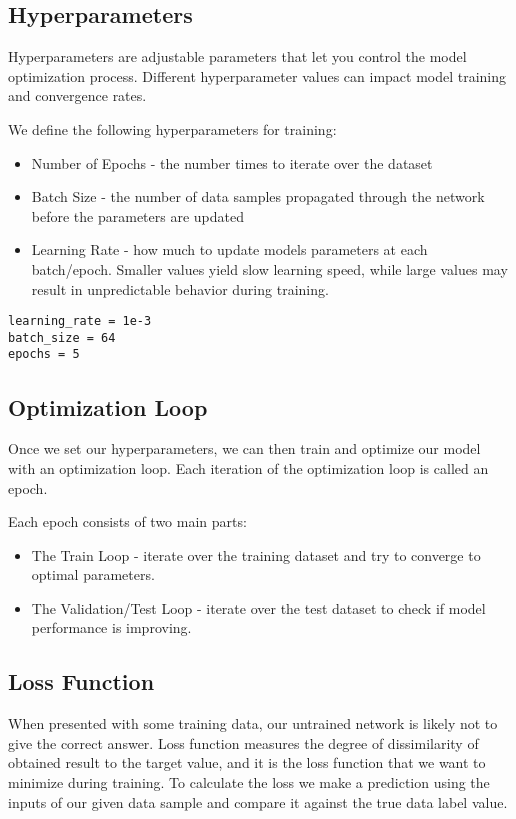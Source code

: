 \documentclass{article}
\begin{document}
\subsection{Hyperparameters}

Hyperparameters are adjustable parameters that let you control the model 
optimization process. Different hyperparameter values can impact model 
training and convergence rates.

We define the following hyperparameters for training:

\begin{itemize}
    \item Number of Epochs - the number times to iterate over the dataset
    \item Batch Size - the number of data samples propagated through the network before the parameters are updated
    \item Learning Rate - how much to update models parameters at each batch/epoch. Smaller values yield slow learning speed, while large values may result in unpredictable behavior during training.
\end{itemize}

\begin{lstlisting}
learning_rate = 1e-3
batch_size = 64
epochs = 5
\end{lstlisting}

\subsection{Optimization Loop}

Once we set our hyperparameters, we can then train and optimize our model 
with an optimization loop. Each iteration of the optimization loop is 
called an epoch.

Each epoch consists of two main parts:

\begin{itemize}
    \item The Train Loop - iterate over the training dataset and try to converge to optimal parameters.
    \item The Validation/Test Loop - iterate over the test dataset to check if model performance is improving.
\end{itemize}

\subsection{Loss Function}

When presented with some training data, our untrained network is likely 
not to give the correct answer. Loss function measures the degree of 
dissimilarity of obtained result to the target value, and it is the loss 
function that we want to minimize during training. To calculate the loss 
we make a prediction using the inputs of our given data sample and compare 
it against the true data label value.
\end{document}
